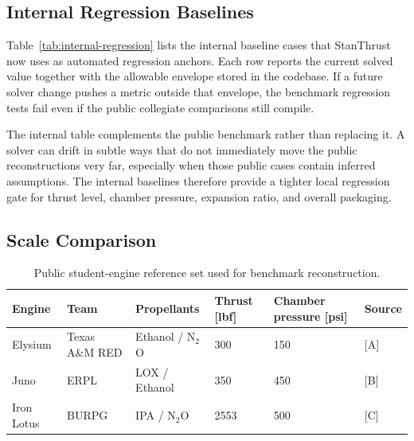 \documentclass[11pt]{article}
\begin{document}
\subsection*{Internal Regression Baselines}
Table~\ref{tab:internal-regression} lists the internal baseline cases that StanThrust now uses as automated regression anchors. Each row reports the current solved value together with the allowable envelope stored in the codebase. If a future solver change pushes a metric outside that envelope, the benchmark regression tests fail even if the public collegiate comparisons still compile.

\begin{table}[H]
\centering
\caption{Internal StanThrust regression baseline cases and allowable envelopes.}
\label{tab:internal-regression}
\scriptsize
{}
\end{table}

The internal table complements the public benchmark rather than replacing it. A solver can drift in subtle ways that do not immediately move the public reconstructions very far, especially when those public cases contain inferred assumptions. The internal baselines therefore provide a tighter local regression gate for thrust level, chamber pressure, expansion ratio, and overall packaging.

\subsection*{Scale Comparison}
\begin{table}[H]
\centering
\caption{Public student-engine reference set used for benchmark reconstruction.}
\label{tab:benchmarks}
\begin{tabular}{llllll}
\toprule
Engine & Team & Propellants & Thrust [lbf] & Chamber pressure [psi] & Source \\
\midrule
Elysium & Texas A\&M RED & Ethanol / N$_2$O & 300 & 150 & [A] \\
Juno & ERPL & LOX / Ethanol & 350 & 450 & [B] \\
Iron Lotus & BURPG & IPA / N$_2$O & 2553 & 500 & [C] \\
\bottomrule
\end{tabular}
\end{table}
\end{document}
